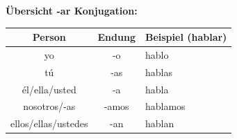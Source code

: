 \documentclass[11pt, a4paper]{article}
\begin{document}
\vspace{10pt}

\noindent\textcolor{loesung}{\textbf{Übersicht -ar Konjugation:}}

\begin{center}
\begin{tabular}{|c|c|l|}
\hline
\textbf{Person} & \textbf{Endung} & \textbf{Beispiel (hablar)} \\
\hline
yo & -o & hablo \\
tú & -as & hablas \\
él/ella/usted & -a & habla \\
nosotros/-as & -amos & hablamos \\
ellos/ellas/ustedes & -an & hablan \\
\hline
\end{tabular}
\end{center}
\end{document}

